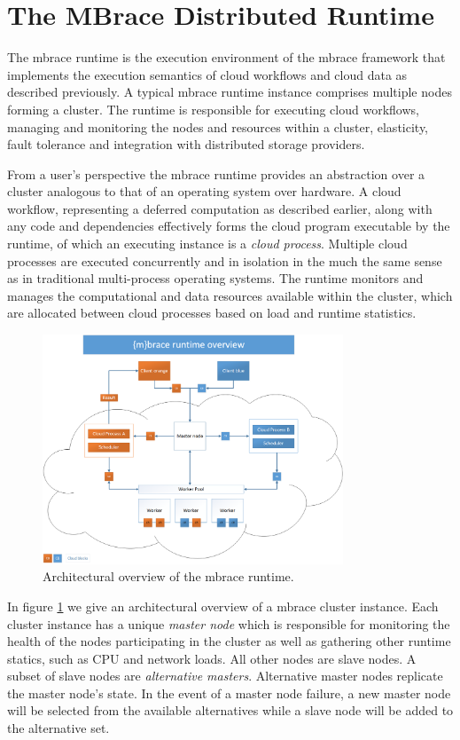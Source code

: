 \documentclass[9pt,a4paper]{article}
\newcommand{\mbrace}{mbrace}
\newcommand{\TitularMbrace}{MBrace}
\begin{document}
\section{The \TitularMbrace{} Distributed Runtime}
\label{sec:runtime}

The \mbrace{} runtime is the execution environment of the \mbrace{} framework
that implements the execution semantics of cloud workflows and cloud data
as described previously. A typical \mbrace{} runtime instance comprises
multiple nodes forming a cluster. The runtime is responsible for executing cloud
workflows, managing and monitoring the nodes and resources within a cluster,
elasticity, fault tolerance and integration with distributed storage providers.

From a user's perspective the \mbrace{} runtime provides an abstraction over a
cluster analogous to that of an operating system over hardware. A cloud
workflow, representing a deferred computation as described earlier, along with
any code and dependencies effectively forms the cloud program executable by the
runtime, of which an executing instance is a \emph{cloud process}. Multiple
cloud processes are executed concurrently and in isolation in the much the same
sense as in traditional multi-process operating systems. The runtime monitors
and manages the computational and data resources available within the cluster,
which are allocated between cloud processes based on load and runtime
statistics.
%
\begin{figure}[ht]
\label{runtime-figure}
\centering
\includegraphics[width=0.8\textwidth]{runtime.png}
\caption{Architectural overview of the \mbrace{} runtime.}
\end{figure}

In figure \ref{runtime-figure} we give an architectural overview of a \mbrace{}
cluster instance. Each cluster instance has a unique \emph{master node} which is
responsible for monitoring the health of the nodes participating in the cluster
as well as gathering other runtime statics, such as CPU and network loads. All
other nodes are slave nodes. A subset of slave nodes are \emph{alternative
  masters}. Alternative master nodes replicate the master node's state. In the
event of a master node failure, a new master node will be selected from the
available alternatives while a slave node will be added to the alternative set.
\end{document}
